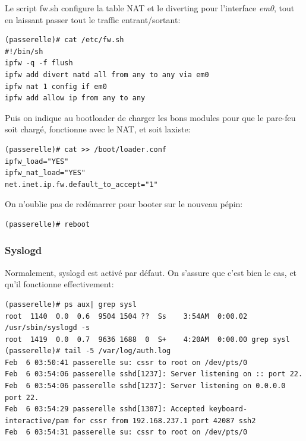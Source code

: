 \documentclass[a4paper]{article}
\begin{document}
Le script fw.sh configure la table NAT et le diverting pour l'interface
\textit{em0}, tout en laissant passer tout le traffic entrant/sortant:
\begin{verbatim}
(passerelle)# cat /etc/fw.sh 
#!/bin/sh
ipfw -q -f flush
ipfw add divert natd all from any to any via em0
ipfw nat 1 config if em0
ipfw add allow ip from any to any
\end{verbatim}

Puis on indique au bootloader de charger les bons modules pour que
le pare-feu soit chargé, fonctionne avec le NAT, et soit laxiste:
\begin{verbatim}
(passerelle)# cat >> /boot/loader.conf
ipfw_load="YES"
ipfw_nat_load="YES"
net.inet.ip.fw.default_to_accept="1"
\end{verbatim}

On n'oublie pas de redémarrer pour booter sur le nouveau pépin:
\begin{verbatim}
(passerelle)# reboot
\end{verbatim}

\subsubsection{Syslogd}
Normalement, syslogd est activé par défaut. On s'assure que c'est
bien le cas, et qu'il fonctionne effectivement:
\begin{verbatim}
(passerelle)# ps aux| grep sysl
root  1140  0.0  0.6  9504 1504 ??  Ss    3:54AM  0:00.02 /usr/sbin/syslogd -s
root  1419  0.0  0.7  9636 1688  0  S+    4:20AM  0:00.00 grep sysl
(passerelle)# tail -5 /var/log/auth.log
Feb  6 03:50:41 passerelle su: cssr to root on /dev/pts/0
Feb  6 03:54:06 passerelle sshd[1237]: Server listening on :: port 22.
Feb  6 03:54:06 passerelle sshd[1237]: Server listening on 0.0.0.0 port 22.
Feb  6 03:54:29 passerelle sshd[1307]: Accepted keyboard-interactive/pam for cssr from 192.168.237.1 port 42087 ssh2
Feb  6 03:54:31 passerelle su: cssr to root on /dev/pts/0
\end{verbatim}
\end{document}
